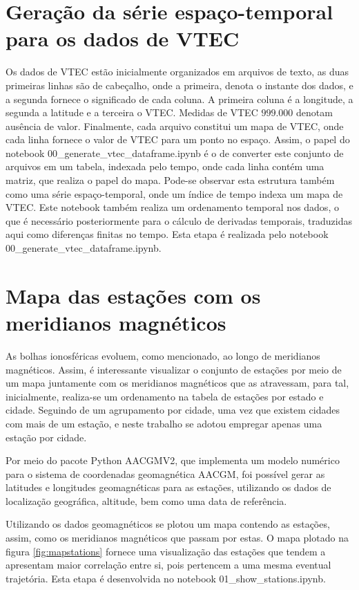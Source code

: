 \section{Geração da série espaço-temporal para os dados de VTEC}

Os dados de VTEC estão inicialmente organizados em arquivos de texto, as duas primeiras linhas são de cabeçalho, onde a primeira, denota o instante dos dados, e a segunda fornece o significado de cada coluna. A primeira coluna é a longitude, a segunda a latitude e a terceira o VTEC. Medidas de VTEC $999.000$ denotam ausência de valor. Finalmente, cada arquivo constitui um mapa de VTEC, onde cada linha fornece o valor de VTEC para um ponto no espaço. Assim, o papel do notebook 00\_generate\_vtec\_dataframe.ipynb é o de converter este conjunto de arquivos em um tabela, indexada pelo tempo, onde cada linha contém uma matriz, que realiza o papel do mapa. Pode-se observar esta estrutura também como uma série espaço-temporal, onde um índice de tempo indexa um mapa de VTEC. Este notebook também realiza um ordenamento temporal nos dados, o que é necessário posteriormente para o cálculo de derivadas temporais, traduzidas aqui como diferenças finitas no tempo. Esta etapa é realizada pelo notebook 00\_generate\_vtec\_dataframe.ipynb.

\section{Mapa das estações com os meridianos magnéticos} 

As bolhas ionosféricas evoluem, como mencionado, ao longo de meridianos magnéticos. Assim, é interessante visualizar o conjunto de estações por meio de um mapa juntamente com os meridianos magnéticos que as atravessam, para tal, inicialmente, realiza-se um ordenamento na tabela de estações por estado e cidade. Seguindo de um agrupamento por cidade, uma vez que existem cidades com mais de um estação, e neste trabalho se adotou empregar apenas uma estação por cidade. 

Por meio do pacote Python AACGMV2, que implementa um modelo numérico para o sistema de coordenadas geomagnética AACGM, foi possível gerar as latitudes e longitudes geomagnéticas para as estações, utilizando os dados de localização geográfica, altitude, bem como uma data de referência.

Utilizando os dados geomagnéticos se plotou um mapa contendo as estações, assim, como os meridianos magnéticos que passam por estas. O mapa plotado na figura \ref{fig:mapstations} fornece uma visualização das estações que tendem a apresentam maior correlação entre si, pois pertencem a uma mesma eventual trajetória. Esta etapa é desenvolvida no notebook 01\_show\_stations.ipynb.

